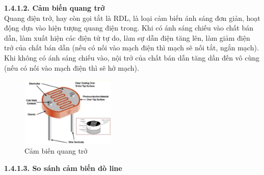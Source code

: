     \textbf{1.4.1.2. Cảm biến quang trở}\\
    \hspace*{0.6cm} Quang điện trở, hay còn gọi tắt là RDL, là loại cảm biến ánh sáng đơn giản, hoạt động
        dựa vào hiện tượng quang điện trong. \newline
    \hspace*{0.6cm} Khi có ánh sáng chiếu vào chất bán dẫn, làm xuất hiện các điện tử tự do, làm sự
        dẫn điện tăng lên, làm giảm điện trở của chất bán dẫn (nếu có nối vào mạch điện thì
        mạch sẽ nối tắt, ngắn mạch). Khi không có ánh sáng chiếu vào, nội trở của chất bán dẫn
        tăng dần đến vô cùng (nếu có nối vào mạch điện thì sẽ hở mạch).
    \begin{figure}[H]
        \centering
        \includegraphics[width=0.4\textwidth]{pictures/chapter1/chapter1_pic16a_photoresistor.png}
        \caption{Cảm biến quang trở}
        \label{chap1_pic16}
    \end{figure}
    \textbf{1.4.1.3. So sánh cảm biến dò line}


